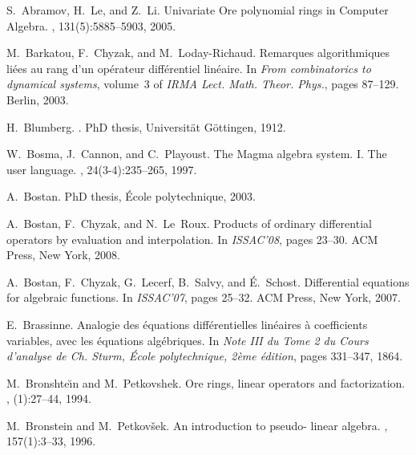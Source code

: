 \documentclass{sig-alt-full}
\begin{document}
\def\cprime{'} \def\cprime{$'$}
\begin{thebibliography}{10}

\medskip 

S.~Abramov, H.~Le, and Z.~Li.
\newblock Univariate {O}re polynomial rings in {C}omputer {A}lgebra.
, 131(5):5885--5903, 2005.

M.~Barkatou, F.~Chyzak, and M.~Loday-Richaud.
\newblock Remarques algorithmiques li\'ees au rang d'un op\'erateur
  diff\'erentiel lin\'eaire.
\newblock In {\em From combinatorics to dynamical systems}, volume~3 of {\em
  IRMA Lect. Math. Theor. Phys.}, pages 87--129. Berlin, 2003.

H.~Blumberg.
.
\newblock PhD thesis, Universit{\"a}t G{\"o}ttingen, 1912.

W.~Bosma, J.~Cannon, and C.~Playoust.
\newblock The {M}agma algebra system. {I}. {T}he user language.
, 24(3-4):235--265, 1997.

A.~Bostan.
\newblock PhD thesis, {\'E}cole polytechnique, 2003.

A.~Bostan, F.~Chyzak, and N.~Le~Roux.
\newblock Products of ordinary differential operators by evaluation and
  interpolation.
\newblock In {\em I{SSAC}'08}, pages 23--30. ACM Press, New York, 2008.

A.~Bostan, F.~Chyzak, G.~Lecerf, B.~Salvy, and {\'E}.~Schost.
\newblock Differential equations for algebraic functions.
\newblock In {\em I{SSAC}'07}, pages 25--32. ACM Press, New York, 2007.

E.~Brassinne.
\newblock Analogie des \'equations diff\'erentielles lin\'eaires \`a
  coefficients variables, avec les \'equations alg\'ebriques.
\newblock In {\em Note III du Tome 2 du Cours d'analyse de Ch. Sturm, {\'E}cole
  polytechnique, 2\`eme \'edition}, pages 331--347, 1864.

M.~Bronshte{\u\i}n and M.~Petkovshek.
\newblock Ore rings, linear operators and factorization.
, (1):27--44, 1994.

M.~Bronstein and M.~Petkov{\v{s}}ek.
\newblock An introduction to pseudo- li\-near algebra.
, 157(1):3--33, 1996.


\end{thebibliography}
\end{document}
